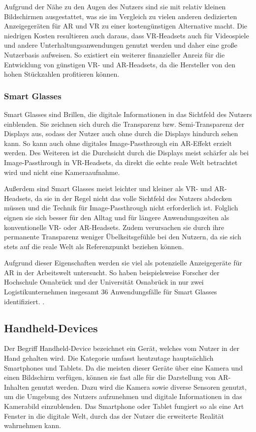     Aufgrund der Nähe zu den Augen des Nutzers sind sie mit relativ kleinen Bildschirmen ausgestattet, was sie im Vergleich zu vielen anderen dedizierten Anzeigegeräten für AR und VR zu einer kostengünstigen Alternative macht.
    Die niedrigen Kosten resultieren auch daraus, dass VR-Headsets auch für Videospiele und andere Unterhaltungsanwendungen genutzt werden und daher eine große Nutzerbasis aufweisen.
    So existiert ein weiterer finanzieller Anreiz für die Entwicklung von günstigen VR- und AR-Headsets, da die Hersteller von den hohen Stückzahlen profitieren können.
   

    \subsubsection{Smart Glasses}

    Smart Glasses sind Brillen, die digitale Informationen in das Sichtfeld des Nutzers einblenden.
    Sie zeichnen sich durch die Transparenz bzw. Semi-Transparenz der Displays aus, sodass der Nutzer auch ohne durch die Displays hindurch sehen kann.
    So kann auch ohne digitales Image-Passthrough ein AR-Effekt erzielt werden.
    Des Weiteren ist die Durchsicht durch die Displays meist schärfer als bei Image-Passthrough in VR-Headsets, da direkt die echte reale Welt betrachtet wird und nicht eine Kameraaufnahme.

    Außerdem sind Smart Glasses meist leichter und kleiner als VR- und AR-Headsets, da sie in der Regel nicht das volle Sichtfeld des Nutzers abdecken müssen und die Technik für Image-Passthrough nicht erforderlich ist.
    Folglich eignen sie sich besser für den Alltag und für längere Anwendungszeiten als konventionelle VR- oder AR-Headsets.
    Zudem verursachen sie durch ihre permanente Transparenz weniger Übelkeitsgefühle bei den Nutzern, da sie sich stets auf die reale Welt als Referenzpunkt beziehen können.

    Aufgrund dieser Eigenschaften werden sie viel als potenzielle Anzeigegeräte für AR in der Arbeitswelt untersucht.
    So haben beispielsweise Forscher der Hochschule Osnabrück und der Universität Osnabrück in nur zwei Logistikunternehmen insgesamt 36 Anwendungsfälle für Smart Glasses identifiziert. \autocite[]{SmartGlasses2017}.


  \subsection{Handheld-Devices}

  Der Begriff \glqq{}Handheld-Device\grqq{} bezeichnet ein Gerät, welches vom Nutzer in der Hand gehalten wird.
  Die Kategorie umfasst heutzutage hauptsächlich Smartphones und Tablets.
  Da die meisten dieser Geräte über eine Kamera und einen Bildschirm verfügen, können sie fast alle für die Darstellung von AR-Inhalten genutzt werden.
  Dazu wird die Kamera sowie diverse Sensoren genutzt, um die Umgebung des Nutzers aufzunehmen und digitale Informationen in das Kamerabild einzublenden.
  Das Smartphone oder Tablet fungiert so als eine Art Fenster in die digitale Welt, durch das der Nutzer die erweiterte Realität wahrnehmen kann.

